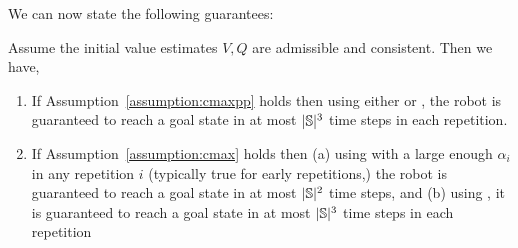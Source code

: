 We can now state the following guarantees:
\begin{theorem}[Completeness]
	Assume the initial value estimates $V, Q$ are admissible and consistent. Then we have,
	\begin{enumerate}
		\item If Assumption~\ref{assumption:cmaxpp} holds then using either \cmaxpp{} or \acmaxpp{}, the robot is guaranteed to reach a goal state in at most $|\mathbb{S}|^3$ time steps in each repetition.
		\item If Assumption~\ref{assumption:cmax} holds then
                  (a) using \acmaxpp{} with a large enough $\alpha_i$
                  in any repetition $i$ (typically true for early
                  repetitions,) the robot is guaranteed to reach a
                  goal state in at most $|\mathbb{S}|^2$ time steps,
                  and (b) using \cmaxpp{}, it is guaranteed to reach a goal state in at most $|\mathbb{S}|^3$ time steps in each repetition
	\end{enumerate}       
	\label{theorem:completeness}
      \end{theorem}

